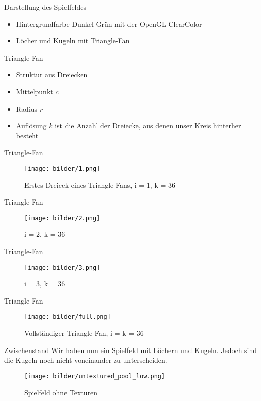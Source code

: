 
\begin{frame}{Darstellung des Spielfeldes}
\begin{itemize}
	\item Hintergrundfarbe Dunkel-Grün mit der OpenGL ClearColor
	\item Löcher und Kugeln mit Triangle-Fan
\end{itemize}
\end{frame}
\begin{frame}{Triangle-Fan}
\begin{itemize}
	\item Struktur aus Dreiecken
	\item Mittelpunkt $c$
	\item Radius $r$
	\item Auflösung $k$ ist die Anzahl der Dreiecke, aus denen unser Kreis hinterher besteht
\end{itemize}
\end{frame}
\begin{frame}{Triangle-Fan}
\begin{figure}
	\caption{Erstes Dreieck eines Triangle-Fans, i = 1, k = 36}
	\texttt{[image: bilder/1.png]}
\end{figure}
\end{frame}
\begin{frame}{Triangle-Fan}
\begin{figure}
	\caption{i = 2, k = 36}
	\texttt{[image: bilder/2.png]}
\end{figure}
\end{frame}
\begin{frame}{Triangle-Fan}
\begin{figure}
	\caption{i = 3, k = 36}
	\texttt{[image: bilder/3.png]}
\end{figure}
\end{frame}
\begin{frame}{Triangle-Fan}
\begin{figure}
	\caption{Vollständiger Triangle-Fan, i = k = 36}
	\texttt{[image: bilder/full.png]}
\end{figure}
\end{frame}
\begin{frame}{Zwischenstand}
Wir haben nun ein Spielfeld mit Löchern und Kugeln. Jedoch sind die Kugeln noch nicht voneinander zu unterscheiden.
\begin{figure}
	\caption{Spielfeld ohne Texturen}
	\texttt{[image: bilder/untextured\_pool\_low.png]}
\end{figure}
\end{frame}
